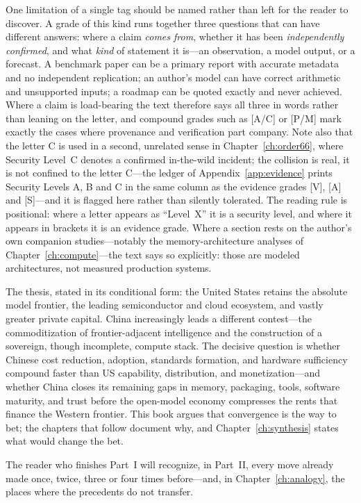 One limitation of a single tag should be named rather than left for the reader to discover. A grade of this kind runs together three questions that can have different answers: where a claim \emph{comes from}, whether it has been \emph{independently confirmed}, and what \emph{kind} of statement it is---an observation, a model output, or a forecast. A benchmark paper can be a primary report with accurate metadata and no independent replication; an author's model can have correct arithmetic and unsupported inputs; a roadmap can be quoted exactly and never achieved. Where a claim is load-bearing the text therefore says all three in words rather than leaning on the letter, and compound grades such as [A/C] or [P/M] mark exactly the cases where provenance and verification part company. Note also that the letter C is used in a second, unrelated sense in Chapter~\ref{ch:order66}, where Security Level~C denotes a confirmed in-the-wild incident; the collision is real, it is not confined to the letter C---the ledger of Appendix~\ref{app:evidence} prints Security Levels A, B and C in the same column as the evidence grades [V], [A] and [S]---and it is flagged here rather than silently tolerated. The reading rule is positional: where a letter appears as ``Level~X'' it is a security level, and where it appears in brackets it is an evidence grade. Where a section rests on the author's own companion studies---notably the memory-architecture analyses of Chapter~\ref{ch:compute}---the text says so explicitly: those are modeled architectures, not measured production systems.

The thesis, stated in its conditional form: the United States retains the absolute model frontier, the leading semiconductor and cloud ecosystem, and vastly greater private capital. China increasingly leads a different contest---the commoditization of frontier-adjacent intelligence and the construction of a sovereign, though incomplete, compute stack. The decisive question is whether Chinese cost reduction, adoption, standards formation, and hardware sufficiency compound faster than US capability, distribution, and monetization---and whether China closes its remaining gaps in memory, packaging, tools, software maturity, and trust before the open-model economy compresses the rents that finance the Western frontier. This book argues that convergence is the way to bet; the chapters that follow document why, and Chapter~\ref{ch:synthesis} states what would change the bet.

The reader who finishes Part~I will recognize, in Part~II, every move already made once, twice, three or four times before---and, in Chapter~\ref{ch:analogy}, the places where the precedents do not transfer.

